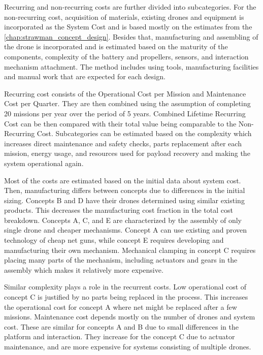 Recurring and non-recurring costs are further divided into subcategories. For the non-recurring cost, acquisition of materials, existing drones and equipment is incorporated as the System Cost and is based mostly on the estimates from the \autoref{chap:strawman_concept_design}. Besides that, manufacturing and assembling of the drone is incorporated and is estimated based on the maturity of the components, complexity of the battery and propellers, sensors, and interaction mechanism attachment. The method includes using tools, manufacturing facilities and manual work that are expected for each design. 

Recurring cost consists of the Operational Cost per Mission and Maintenance Cost per Quarter. They are then combined using the assumption of completing 20 missions per year over the period of 5 years. Combined Lifetime Recurring Cost can be then compared with their total value being comparable to the Non-Recurring Cost. Subcategories can be estimated based on the complexity which increases direct maintenance and safety checks, parts replacement after each mission, energy usage, and resources used for payload recovery and making the system operational again. 

Most of the costs are estimated based on the initial data about system cost. Then, manufacturing differs between concepts due to differences in the initial sizing. Concepts B and D have their drones determined using similar existing products. This decreases the manufacturing cost fraction in the total cost breakdown.  Concepts A, C, and E are characterized by the assembly of only single drone and cheaper mechanisms. Concept A can use existing and proven technology of cheap net guns, while concept E requires developing and manufacturing their own mechanism. Mechanical clamping in concept C requires placing many parts of the mechanism, including actuators and gears in the assembly which makes it relatively more expensive.

Similar complexity plays a role in the recurrent costs. Low operational cost of concept C is justified by no parts being replaced in the process. This increases the operational cost for concept A where net might be replaced after a few missions. Maintenance cost depends mostly on the number of drones and system cost. These are similar for concepts A and B due to small differences in the platform and interaction. They increase for the concept C due to actuator maintenance, and are more expensive for systems consisting of multiple drones.

